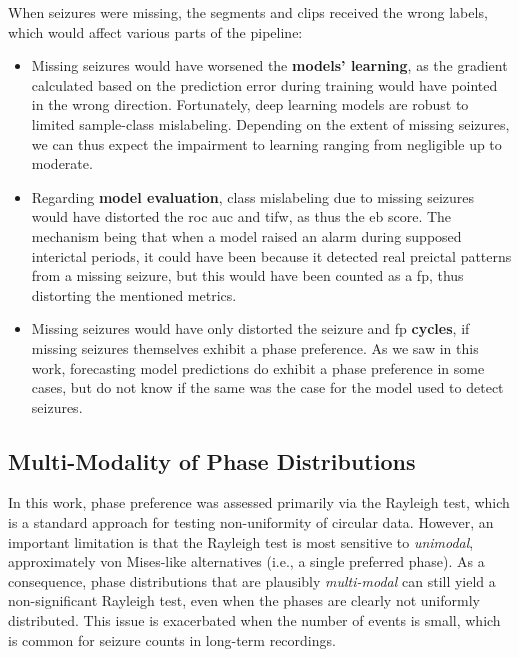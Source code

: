 When seizures were missing, the segments and clips received the wrong labels, which would affect various parts of the pipeline:

\begin{itemize}
    \item Missing seizures would have worsened the \textbf{models' learning}, as the gradient calculated based on the prediction error during training would have pointed in the wrong direction.
    Fortunately, deep learning models are robust to limited sample-class mislabeling.
    Depending on the extent of missing seizures, we can thus expect the impairment to learning ranging from negligible up to moderate.

    \item Regarding \textbf{model evaluation}, class mislabeling due to missing seizures would have distorted the \gls{roc auc} and \gls{tifw}, as thus the \gls{eb} score.
    The mechanism being that when a model raised an alarm during supposed interictal periods, it could have been because it detected real preictal patterns from a missing seizure, but this would have been counted as a \gls{fp}, thus distorting the mentioned metrics.

    \item Missing seizures would have only distorted the seizure and \gls{fp} \textbf{cycles}, if missing seizures themselves exhibit a phase preference.
    As we saw in this work, forecasting model predictions do exhibit a phase preference in some cases, but do not know if the same was the case for the model used to detect seizures.
\end{itemize}


\subsection{Multi-Modality of Phase Distributions}
In this work, phase preference was assessed primarily via the Rayleigh test, which is a standard approach for testing non-uniformity of circular data.
However, an important limitation is that the Rayleigh test is most sensitive to \emph{unimodal}, approximately von Mises-like alternatives (i.e., a single preferred phase).
As a consequence, phase distributions that are plausibly \emph{multi-modal} can still yield a non-significant Rayleigh test, even when the phases are clearly not uniformly distributed.
This issue is exacerbated when the number of events is small, which is common for seizure counts in long-term recordings.

